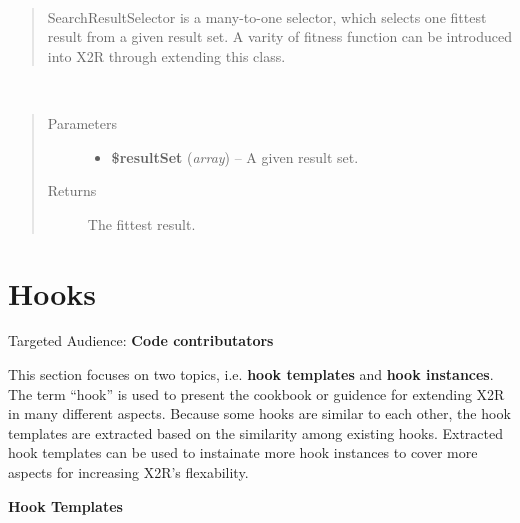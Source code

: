 \documentclass[letterpaper,10pt,english]{sphinxmanual}
\begin{document}
\begin{fulllineitems}
\label{docs/api:SearchResultSelector}~\begin{quote}

SearchResultSelector is a many-to-one selector, which selects one fittest result from a given result set. A varity of fitness function can be introduced into X2R through extending this class.
\end{quote}

\begin{fulllineitems}
\label{docs/api:SearchResultSelector::select}~\begin{quote}\begin{description}
\item[{Parameters}] \leavevmode\begin{itemize}
\item {} 
\textbf{\$resultSet} (\emph{array}) -- A given result set.

\end{itemize}

\item[{Returns}] \leavevmode
The fittest result.

\end{description}\end{quote}

\end{fulllineitems}


\end{fulllineitems}



\chapter{Hooks}
\label{index:hooks}
Targeted Audience: \textbf{Code contributators}

This section focuses on two topics, i.e. \textbf{hook templates} and \textbf{hook instances}. The term ``hook'' is used to present the cookbook or guidence for extending X2R in many different aspects. Because some hooks are similar to each other, the hook templates are extracted based on the similarity among existing hooks. Extracted hook templates can be used to instainate more hook instances to cover more aspects for increasing X2R's flexability.

\textbf{Hook Templates}
\end{document}
